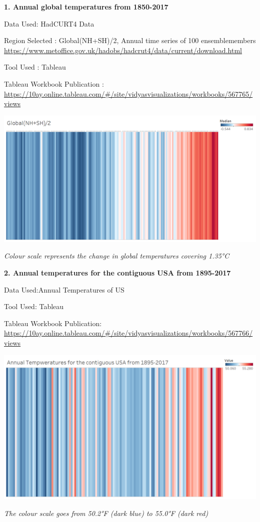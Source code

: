 \documentclass[]{book}
\begin{document}
\textbf{1. Annual global temperatures from 1850-2017}

Data Used: HadCURT4 Data

Region Selected : Global(NH+SH)/2, Annual time series of 100 ensemblemembers \url{https://www.metoffice.gov.uk/hadobs/hadcrut4/data/current/download.html}

Tool Used : Tableau

Tableau Workbook Publication : \url{https://10ay.online.tableau.com/\#/site/vidyasvisualizations/workbooks/567765/views}

\includegraphics{_images/Global_WarmingStrips.png}

\emph{Colour scale represents the change in global temperatures covering 1.35°C}

\textbf{2. Annual temperatures for the contiguous USA from 1895-2017}

Data Used:Annual Temperatures of US \citep{NOAA}

Tool Used: Tableau

Tableau Workbook Publication: \url{https://10ay.online.tableau.com/\#/site/vidyasvisualizations/workbooks/567766/views}

\includegraphics{_images/US_WarmingStrips.png}

\emph{The colour scale goes from 50.2°F (dark blue) to 55.0°F (dark red)}


\end{document}
